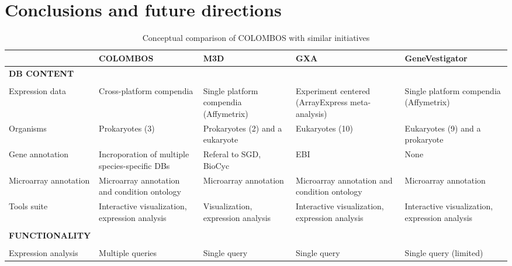 \section{Conclusions and future directions}

\begin{table}
	\centering
	\begin{threeparttable}
	\begin{footnotesize}
	\caption{Conceptual comparison of COLOMBOS with similar initiatives}
	\label{tab:colTB-comp}
	\begin{tabular}{p{2cm} p{2.2cm} p{2cm} p{2cm} p{2.3cm}}
		\toprule
		 & {\centering\bf\small COLOMBOS} & {\centering\bf\small M3D} & 
		 {\centering\bf\small GXA} & {\centering\bf\small GeneVestigator} 
		 \\
		\midrule
		\multicolumn{2}{l}{\bf DB CONTENT}  &  &  &  \\
		\hline \\[-1.8ex]
		Expression data\tnote{1} & Cross-platform compendia & Single platform 
		compendia (Affymetrix) & Experiment centered (ArrayExpress 
		meta-analysis) & Single platform compendia (Affymetrix)\\[1ex]
		
		Organisms & Prokaryotes (3) & Prokaryotes (2) and a eukaryote & 
		Eukaryotes (10) & Eukaryotes (9) and a prokaryote \\[1ex] 
		
		Gene annotation & Incroporation of multiple species-specific DBs & 
		Referal to SGD, BioCyc & EBI & None\\[1ex] 
		
		Microarray annotation & Microarray annotation and condition 
		ontology\tnote{2} & Microarray annotation & Microarray annotation and 
		condition ontology\tnote{2} & Microarray annotation \\[1ex] 
		
		Tools suite & Interactive visualization, expression analysis & 
		Visualization, expression analysis & Interactive visualization, 
		expression analysis & Interactive visualization, expression analysis 
		\\[1ex] 
		\hline \\[-1.8ex]
		{\bf FUNCTIONALITY} \\
		\hline \\[-1.8ex]
		Expression analysis\tnote{3} & Multiple queries & Single query & Single 
		query & Single query (limited) \\[1ex] 
		

\end{tabular}
\end{footnotesize}
\end{threeparttable}
\end{table}
